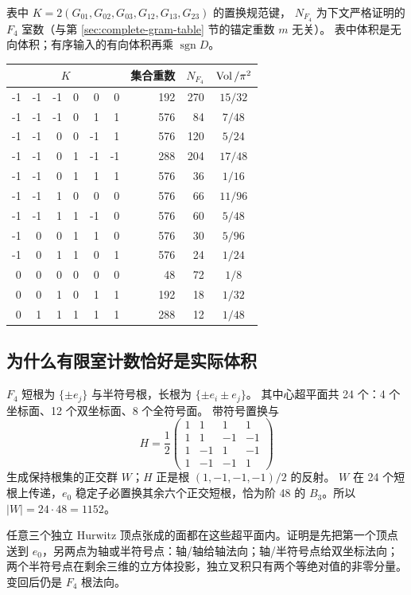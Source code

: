 表中 $K=2(G_{01},G_{02},G_{03},G_{12},G_{13},G_{23})$ 的置换规范键，
$N_{F_4}$ 为下文严格证明的 $F_4$ 室数（与第 \ref{sec:complete-gram-table} 节的锚定重数 $m$ 无关）。
表中体积是无向体积；有序输入的有向体积再乘 $\operatorname{sgn}D$。
\begin{center}\small
\begin{tabular}{@{}rrrrrr|rrc@{}}
\toprule
\multicolumn{6}{c|}{$K$}&集合重数&$N_{F_4}$&$\operatorname{Vol}/\pi^2$\\\midrule
-1&-1&-1&0&0&0&192&270&$15/32$\\
-1&-1&-1&0&1&1&576&84&$7/48$\\
-1&-1&0&0&-1&1&576&120&$5/24$\\
-1&-1&0&1&-1&-1&288&204&$17/48$\\
-1&-1&0&1&1&1&576&36&$1/16$\\
-1&-1&1&0&0&0&576&66&$11/96$\\
-1&-1&1&1&-1&0&576&60&$5/48$\\
-1&0&0&1&1&0&576&30&$5/96$\\
-1&0&1&1&0&1&576&24&$1/24$\\
0&0&0&0&0&0&48&72&$1/8$\\
0&0&1&0&1&1&192&18&$1/32$\\
0&1&1&1&1&1&288&12&$1/48$\\\bottomrule
\end{tabular}\end{center}

\subsection{为什么有限室计数恰好是实际体积}

$F_4$ 短根为 $\{\pm e_j\}$ 与半符号根，长根为 $\{\pm e_i\pm e_j\}$。
其中心超平面共 24 个：4 个坐标面、12 个双坐标面、8 个全符号面。
带符号置换与
\[
H=\frac12\begin{pmatrix}1&1&1&1\\1&1&-1&-1\\1&-1&1&-1\\1&-1&-1&1\end{pmatrix}
\]
生成保持根集的正交群 $W$；$H$ 正是根 $(1,-1,-1,-1)/2$ 的反射。
$W$ 在 24 个短根上传递，$e_0$ 稳定子必置换其余六个正交短根，恰为阶 48 的
$B_3$。所以 $|W|=24\cdot48=1152$。

任意三个独立 Hurwitz 顶点张成的面都在这些超平面内。证明是先把第一个顶点送到
$e_0$，另两点为轴或半符号点：轴/轴给轴法向；轴/半符号点给双坐标法向；
两个半符号点在剩余三维的立方体投影，独立叉积只有两个等绝对值的非零分量。
变回后仍是 $F_4$ 根法向。

